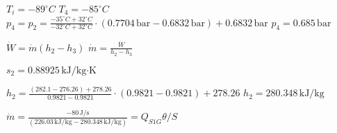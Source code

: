 \( T_i = -89^\circ C \)  
\( T_4 = -85^\circ C \)  
\( p_4 = p_2 = \frac{-35^\circ C + 32^\circ C}{-32^\circ C + 32^\circ C} \cdot (0.7704 \, \text{bar} - 0.6832 \, \text{bar}) + 0.6832 \, \text{bar} \)  
\( p_4 = 0.685 \, \text{bar} \)  

\( \dot{W} = \dot{m} (h_2 - h_3) \)  
\( \dot{m} = \frac{\dot{W}}{h_2 - h_3} \)  

\( s_2 = 0.88925 \, \text{kJ/kg·K} \)  

\( h_2 = \frac{(282.1 - 276.26) + 278.26}{0.9821 - 0.9821} \cdot (0.9821 - 0.9821) + 278.26 \)  
\( h_2 = 280.348 \, \text{kJ/kg} \)  

\( \dot{m} = \frac{-80 \, \text{J/s}}{(226.03 \, \text{kJ/kg} - 280.348 \, \text{kJ/kg})} = Q_{S1G} \theta / S \)